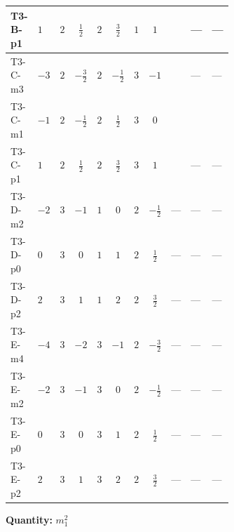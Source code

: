 \documentclass[8pt]{article}
\begin{document}
\begin{landscape}
\begin{longtable}{@{}llcccccc >{\raggedright\arraybackslash}p{0.21\linewidth} >{\raggedright\arraybackslash}p{0.21\linewidth} >{\raggedright\arraybackslash}p{0.21\linewidth}@{}}
\midrule
T3-B-p1 & $1$ & $2$ & $\frac{1}{2}$ & $2$ & $\frac{3}{2}$ & $1$ & $1$ & \scriptsize\adjustbox{max width=\linewidth}{$\begin{gathered} -\frac{3 {g_1}^2 {m_1^2}}{2}\end{gathered}$} & --- & --- \\
\midrule
T3-C-m3 & $-3$ & $2$ & $-\frac{3}{2}$ & $2$ & $-\frac{1}{2}$ & $3$ & $-1$ & \scriptsize\adjustbox{max width=\linewidth}{$\begin{gathered} -\frac{27 {g_1}^2 {m_1^2}}{2}\end{gathered}$} & --- & --- \\
\midrule
T3-C-m1 & $-1$ & $2$ & $-\frac{1}{2}$ & $2$ & $\frac{1}{2}$ & $3$ & $0$ & \scriptsize\adjustbox{max width=\linewidth}{$\begin{gathered} -\frac{3 {g_1}^2 {m_1^2}}{2}\end{gathered}$} & \scriptsize\adjustbox{max width=\linewidth}{$\begin{gathered} -12 \operatorname{Tr}\!\left({M_F}\,\left({M_F}\right)^{*}\,\left({y_1}\right)^{T}\,\left({y_1}\right)^{*}\right)\end{gathered}$} & \scriptsize\adjustbox{max width=\linewidth}{$\begin{gathered} -12 \operatorname{Tr}\!\left({M_F}\,\left({y_1}\right)^{\dagger}\,{y_1}\,\left({M_F}\right)^{*}\right)\end{gathered}$} \\
\midrule
T3-C-p1 & $1$ & $2$ & $\frac{1}{2}$ & $2$ & $\frac{3}{2}$ & $3$ & $1$ & \scriptsize\adjustbox{max width=\linewidth}{$\begin{gathered} -\frac{3 {g_1}^2 {m_1^2}}{2}\end{gathered}$} & --- & --- \\
\midrule
T3-D-m2 & $-2$ & $3$ & $-1$ & $1$ & $0$ & $2$ & $-\frac{1}{2}$ & --- & --- & --- \\
\midrule
T3-D-p0 & $0$ & $3$ & $0$ & $1$ & $1$ & $2$ & $\frac{1}{2}$ & --- & --- & --- \\
\midrule
T3-D-p2 & $2$ & $3$ & $1$ & $1$ & $2$ & $2$ & $\frac{3}{2}$ & --- & --- & --- \\
\midrule
T3-E-m4 & $-4$ & $3$ & $-2$ & $3$ & $-1$ & $2$ & $-\frac{3}{2}$ & --- & --- & --- \\
\midrule
T3-E-m2 & $-2$ & $3$ & $-1$ & $3$ & $0$ & $2$ & $-\frac{1}{2}$ & --- & --- & --- \\
\midrule
T3-E-p0 & $0$ & $3$ & $0$ & $3$ & $1$ & $2$ & $\frac{1}{2}$ & --- & --- & --- \\
\midrule
T3-E-p2 & $2$ & $3$ & $1$ & $3$ & $2$ & $2$ & $\frac{3}{2}$ & --- & --- & --- \\
\midrule
\bottomrule
\end{longtable}
\clearpage
\noindent\textbf{Quantity: }$m_1^2$\par\smallskip

\end{landscape}
\end{document}
